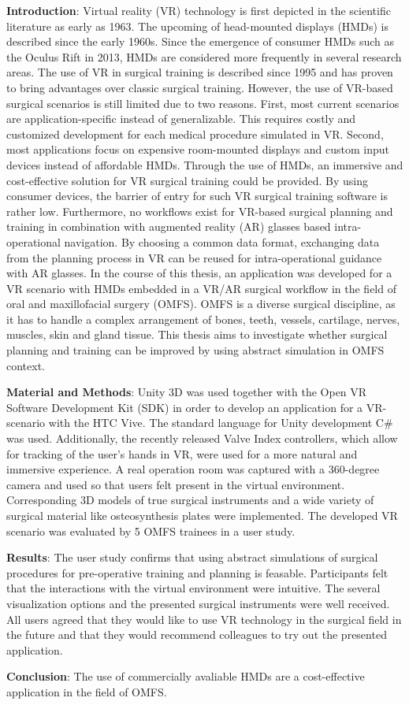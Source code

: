 \textbf{Introduction}: Virtual reality (VR) technology is first depicted in the scientific literature as early as 1963.
The upcoming of head-mounted displays (HMDs) is described since the early 1960s.
Since the emergence of consumer HMDs such as the Oculus Rift in 2013, HMDs are considered more frequently in several research areas.
The use of VR in surgical training is described since 1995 and has proven to bring advantages over classic surgical training.
However, the use of VR-based surgical scenarios is still limited due to two reasons.
First, most current scenarios are application-specific instead of generalizable.
This requires costly and customized development for each medical procedure simulated in VR.
Second, most applications focus on expensive room-mounted displays and custom input devices instead of affordable HMDs.
Through the use of HMDs, an immersive and cost-effective solution for VR surgical training could be provided.
By using consumer devices, the barrier of entry for such VR surgical training software is rather low.
Furthermore, no workflows exist for VR-based surgical planning and training in combination with augmented reality (AR) glasses based intra-operational navigation.
By choosing a common data format, exchanging data from the planning process in VR can be reused for intra-operational guidance with AR glasses.
In the course of this thesis, an application was developed for a VR scenario with HMDs embedded in a VR/AR surgical workflow in 
the field of oral and maxillofacial surgery (OMFS).
OMFS is a diverse surgical discipline, as it has to handle 
a complex arrangement of bones, teeth, vessels, cartilage, nerves, muscles,
skin and gland tissue. This thesis aims to investigate
whether surgical planning and training can be improved by using
abstract simulation in OMFS context.

\textbf{Material and Methods}: Unity 3D was used together with the Open VR Software Development Kit (SDK) in order to develop an application for a VR-scenario with the HTC Vive.
The standard language for Unity development C\# was used. 
Additionally, the recently released Valve Index controllers, which allow for tracking of the user's hands in VR, were used for a more natural and immersive experience.
A real operation room was captured with a 360-degree camera and used so that users felt present in the virtual environment.
Corresponding 3D models of true surgical instruments and a wide variety of surgical material like osteosynthesis plates were implemented.
The developed VR scenario was evaluated by 5 OMFS trainees in a user study.

\textbf{Results}: The user study confirms that using abstract simulations of surgical procedures for pre-operative training and planning is feasable.
Participants felt that the interactions with the virtual environment were intuitive.
The several visualization options and the presented surgical instruments were well received.
All users agreed that they would like to use VR technology in the surgical field in the future and that they would recommend colleagues to try out the presented
application. 

\textbf{Conclusion}: The use of commercially avaliable HMDs are a cost-effective application in the field of OMFS.